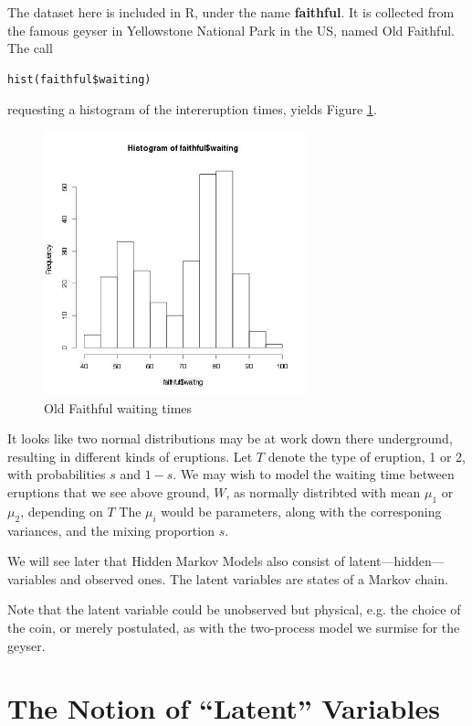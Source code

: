 The dataset here is included in R, under the name \textbf{faithful}.  It
is collected from the famous geyser in Yellowstone National Park in the
US, named Old Faithful.  The call

\begin{lstlisting}
hist(faithful$waiting)
\end{lstlisting}

requesting a histogram of the intereruption times,
yields Figure \ref{faithfulhist}.

\begin{figure}[tb]
\centerline{
\includegraphics[width=3.0in]{Faithful.jpg}
}
\caption{Old Faithful waiting times}
\label{faithfulhist}
\end{figure}

It looks like two normal distributions may be at work down there
underground, resulting in different kinds of eruptions.  Let $T$
denote the type of eruption, 1 or 2, with probabilities $s$ and $1-s$.
We may wish to model the waiting time between eruptions that we see
above ground, $W$, as normally distribted with mean $\mu_1$ or $\mu_2$,
depending on $T$  The $\mu_i$ would be parameters, along with the
corresponing variances, and the mixing proportion $s$.

We will see later that Hidden Markov Models also consist of
latent---hidden---variables and observed ones.  The latent variables
are states of a Markov chain.

Note that the latent variable could be unobserved but physical, e.g. the
choice of the coin, or merely postulated, as with the two-process model
we surmise for the geyser.

\section{The Notion of ``Latent'' Variables}

